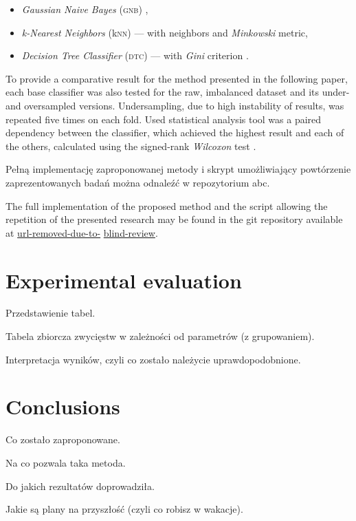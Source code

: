 \documentclass[pmlr]{jmlr}
\begin{document}
\begin{itemize}
	\item \emph{Gaussian Naive Bayes} (\textsc{gnb}) \citep{gnb},
	\item \emph{k-Nearest Neighbors} (k\textsc{nn}) --- with  neighbors and \emph{Minkowski} metric,
	\item \emph{Decision Tree Classifier} (\textsc{dtc}) --- with \emph{Gini} criterion \citep{loh2011classification}.
\end{itemize}

To provide a comparative result for the method presented in the following paper, each base classifier was also tested for the raw, imbalanced dataset and its under- and oversampled versions. Undersampling, due to high instability of results, was repeated five times on each fold. Used statistical analysis tool was a paired dependency between the classifier, which achieved the highest result and each of the others, calculated using the signed-rank \emph{Wilcoxon} test \citep{wilcoxon1945individual}.

Pełną implementację zaproponowanej metody i skrypt umożliwiający powtórzenie zaprezentowanych badań można odnaleźć w repozytorium abc.

The full implementation of the proposed method and the script allowing the repetition of the presented research may be found in the git repository available at \url{url-removed-due-to-} \url{blind-review}.

\section{Experimental evaluation}
\label{sec:intro}

Przedstawienie tabel.

\begin{table}
\end{table}

\begin{table}
\end{table}

\begin{table}
\end{table}

Tabela zbiorcza zwycięstw w zależności od parametrów (z grupowaniem).

Interpretacja wyników, czyli co zostało należycie uprawdopodobnione.

\section{Conclusions}
\label{sec:intro}
Co zostało zaproponowane.

Na co pozwala taka metoda.

Do jakich rezultatów doprowadziła.

Jakie są plany na przyszłość (czyli co robisz w wakacje).




\end{document}
